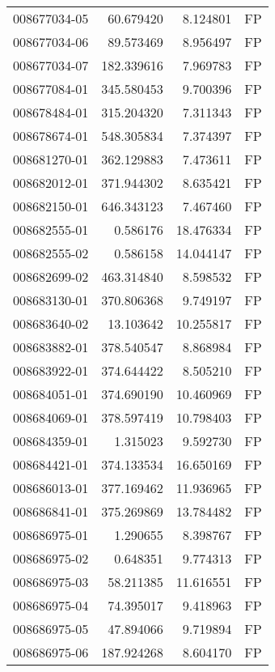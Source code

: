 \begin{tabular}{lrrl}
008677034-05 &   60.679420 &       8.124801 &   FP \\
008677034-06 &   89.573469 &       8.956497 &   FP \\
008677034-07 &  182.339616 &       7.969783 &   FP \\
008677084-01 &  345.580453 &       9.700396 &   FP \\
008678484-01 &  315.204320 &       7.311343 &   FP \\
008678674-01 &  548.305834 &       7.374397 &   FP \\
008681270-01 &  362.129883 &       7.473611 &   FP \\
008682012-01 &  371.944302 &       8.635421 &   FP \\
008682150-01 &  646.343123 &       7.467460 &   FP \\
008682555-01 &    0.586176 &      18.476334 &   FP \\
008682555-02 &    0.586158 &      14.044147 &   FP \\
008682699-02 &  463.314840 &       8.598532 &   FP \\
008683130-01 &  370.806368 &       9.749197 &   FP \\
008683640-02 &   13.103642 &      10.255817 &   FP \\
008683882-01 &  378.540547 &       8.868984 &   FP \\
008683922-01 &  374.644422 &       8.505210 &   FP \\
008684051-01 &  374.690190 &      10.460969 &   FP \\
008684069-01 &  378.597419 &      10.798403 &   FP \\
008684359-01 &    1.315023 &       9.592730 &   FP \\
008684421-01 &  374.133534 &      16.650169 &   FP \\
008686013-01 &  377.169462 &      11.936965 &   FP \\
008686841-01 &  375.269869 &      13.784482 &   FP \\
008686975-01 &    1.290655 &       8.398767 &   FP \\
008686975-02 &    0.648351 &       9.774313 &   FP \\
008686975-03 &   58.211385 &      11.616551 &   FP \\
008686975-04 &   74.395017 &       9.418963 &   FP \\
008686975-05 &   47.894066 &       9.719894 &   FP \\
008686975-06 &  187.924268 &       8.604170 &   FP \\

\end{tabular}
